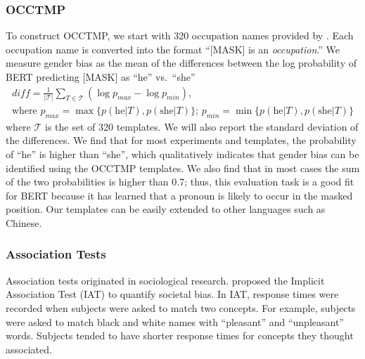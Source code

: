 \subsubsection{OCCTMP}
\label{sec:occtmp}
To construct OCCTMP, we start with 320 occupation names %
provided by . Each occupation name is converted into the format ``[MASK] is an \textit{occupation}.''
We measure gender bias as the mean of the differences between the log probability of BERT predicting [MASK] as ``he'' vs.\ ``she''
\begin{gather*}
\textit{diff}=\frac{1}{|{\mathcal T}|} \sum_{T \in
	{\mathcal T}}(\log p_{max} - \log p_{min}),\\
\mbox{where }p_{max}=\max\{p(\mbox{he}| T),p(\mbox{she}| T)\} \mbox{; }p_{min}=\min\{p(\mbox{he}| T),p(\mbox{she}| T)\}
\end{gather*}
where $\mathcal T$ is the set of 320 templates. 
We will also report the standard deviation of the differences. We find that for most experiments and templates, the probability of
``he'' is higher than ``she'', which qualitatively indicates
that gender bias can be identified using the OCCTMP templates. We also find that in most cases the sum of the two probabilities is higher than 0.7; thus, this evaluation task is a good fit for BERT because it has learned that a pronoun is likely to occur in the masked position. Our templates can be easily extended to other languages such as Chinese.

\subsubsection{Association Tests}\label{sec:weat}
Association tests originated in sociological research.  proposed the Implicit Association Test (IAT) to quantify societal bias. In IAT, response times were recorded when subjects were asked to match two concepts. For example, subjects were asked to match black and white names with “pleasant” and “unpleasant” words. Subjects tended to have shorter response times for concepts they thought associated. 

